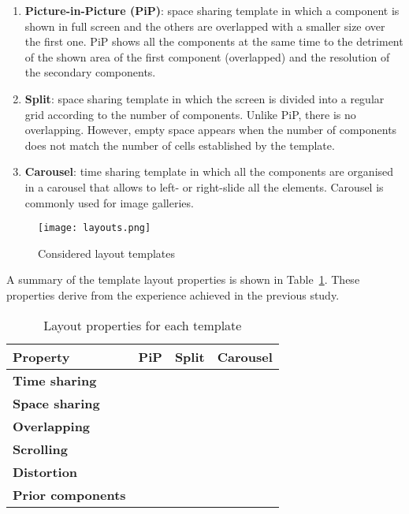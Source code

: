 \begin{enumerate}
	\item \textbf{Picture-in-Picture (PiP)}: space sharing template in which a component is shown in full screen and the others are overlapped with a smaller size over the first one. PiP shows all the components at the same time to the detriment of the shown area of the first component (overlapped) and the resolution of the secondary components. 
	\item \textbf{Split}: space sharing template in which the screen is divided into a regular grid according to the number of components. Unlike PiP, there is no overlapping. However, empty space appears when the number of components does not match the number of cells established by the template.
	\item \textbf{Carousel}: time sharing template in which all the components are organised in a carousel that allows to left- or right-slide all the elements. Carousel is commonly used for image galleries. 
\end{enumerate}

\begin{figure}	
	\begin{center}
		\texttt{[image: layouts.png]}
		\caption{Considered layout templates}
		\label{fig:layouts}
	\end{center}
\end{figure} 

A summary of the template layout properties is shown in Table~\ref{tab:layoutprop}. These properties derive from the experience achieved in the previous study. 



\begin{table}
	\centering
	\caption {Layout properties for each template}\label{tab:layoutprop}
	\begin{tabular}{||l|c|c|c||}
		\hline
		\textbf{Property} & \textbf{PiP} & \textbf{Split} & \textbf{Carousel} \\
		
		\hline
		\textbf{Time sharing} & \xmark & \xmark & \cmark \\
		\hline
		\textbf{Space sharing} & \cmark & \cmark & \xmark \\
		\hline
		\textbf{Overlapping} & \cmark & \xmark & \xmark \\
		\hline
		\textbf{Scrolling} & \xmark & \xmark & \xmark \\
		\hline 
		\textbf{Distortion} & \cmark & \cmark & \cmark \\
		\hline
		\textbf{Prior components} & \cmark & \xmark & \xmark \\
		\hline 
	\end{tabular}
\end{table}


